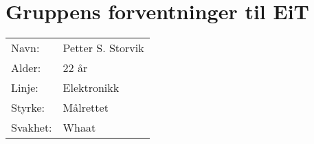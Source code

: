 \section{Gruppens forventninger til EiT}
\begin{table}[H]
    \begin{tabular}{l l}
        Navn: & Petter S. Storvik \\
        Alder: & 22 år \\ 
        Linje: & Elektronikk \\
        Styrke: & Målrettet \\
        Svakhet: & Whaat 
    \end{tabular}
\end{table}

\lipsum[0-1]
